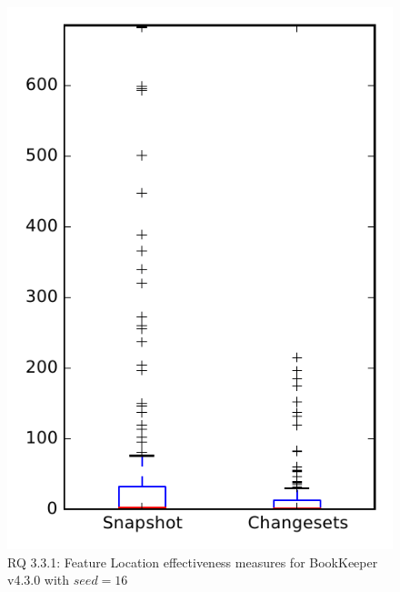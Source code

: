 
\begin{figure}
\centering
\includegraphics[height=0.4\textheight]{figures/flt_seed/rq1_bookkeeper_16}
\caption{RQ 3.3.1: Feature Location effectiveness measures for BookKeeper v4.3.0 with $seed=16$}
\label{fig:flt_seed:rq1:bookkeeper}
\end{figure}
